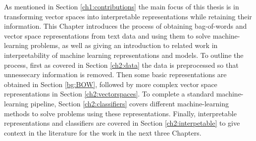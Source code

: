 







As mentioned in Section \ref{ch1:contributions} the main focus of this thesis is in transforming vector spaces into interpretable representations while retaining their information. This Chapter introduces the process of obtaining bag-of-words and vector space representations from text data and using them to solve machine-learning problems, as well as giving an introduction to related work in interpretability of machine learning representations and models. To outline the process, first as covered in Section \ref{ch2:data} the data is preprocessed so that unnessecary information is removed. Then some basic representations are obtained in Section \ref{bg:BOW}, followed by more complex vector space representations in Section \ref{ch2:vectorspaces}. To complete a standard machine-learning pipeline, Section \ref{ch2:classifiers} covers different machine-learning methods to solve problems using these representations. Finally, interpretable representations and classifiers are covered in Section \ref{ch2:interpetable} to give context in the literature for the work in the next three Chapters. 


